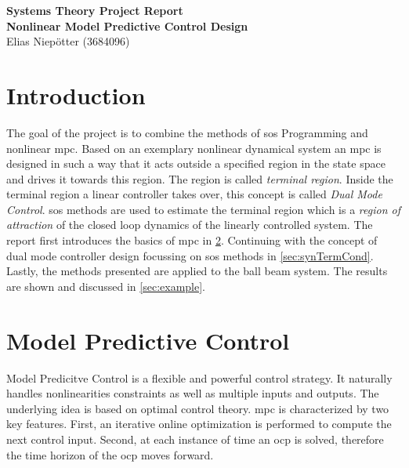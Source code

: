 \documentclass[10pt,a4paper]{article}
\begin{document}
\pagestyle{fancy}

\setlength{\parindent}{0pt}


\begin{center}
	\LARGE{\textbf{Systems Theory Project Report}}\\[0.25em]
	\normalsize\textbf{Nonlinear Model Predictive Control Design}\\[0.25em]
	\normalsize{Elias Niepötter (3684096)}
\end{center}

\vskip 0.5cm

\begin{abstract}
\end{abstract}

\vskip 0.5cm


\section{Introduction}
The goal of the project is to combine the methods of \gls{sos} Programming and nonlinear \gls{mpc}.
Based on an exemplary nonlinear dynamical system an \gls{mpc} is designed in such a way that it acts outside a specified
region in the state space and drives it towards this region. The region is called \textit{terminal region}. Inside the
terminal region a linear controller takes over, this concept is called \textit{Dual Mode Control}. \gls{sos} methods are 
used to estimate the terminal region which is a \textit{region of attraction} of the closed loop dynamics of the linearly 
controlled system.
The report first introduces the basics of \gls{mpc} in \ref{sec:mpc}. Continuing with the concept of dual mode controller 
design focussing on \gls{sos} methods in \ref{sec:synTermCond}. Lastly, the methods presented are applied to the 
ball beam system. The results are shown and discussed in \ref{sec:example}. 











\section{Model Predictive Control}
\label{sec:mpc}
Model Predicitve Control is a flexible and powerful control strategy. It naturally handles nonlinearities constraints as
well as multiple inputs and outputs. The underlying idea is based on optimal control theory. \gls{mpc} is characterized by
two key features. First, an iterative online optimization is performed to compute the next control input. Second, at each 
instance of time an \gls{ocp} is solved, therefore the time horizon of the \gls{ocp} moves forward. \cite{nmpcBible}
\end{document}

